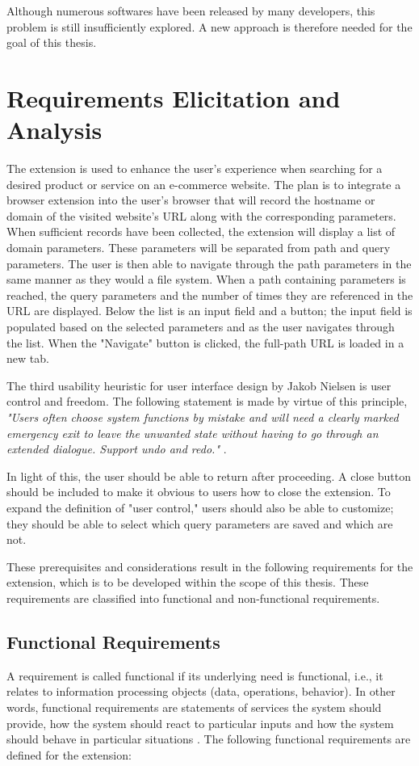 Although numerous softwares have been released by many developers, this problem is still insufficiently explored. A new approach is therefore needed for the goal of this thesis.

\section{Requirements Elicitation and Analysis}
\label{requirements_analysis}
The extension is used to enhance the user's experience when searching for a desired product or service on an e-commerce website. The plan is to integrate a browser extension into the user's browser that will record the hostname or domain of the visited website's URL along with the corresponding parameters. When sufficient records have been collected, the extension will display a list of domain parameters. These parameters will be separated from path and query parameters. The user is then able to navigate through the path parameters in the same manner as they would a file system. When a path containing parameters is reached, the query parameters and the number of times they are referenced in the URL are displayed. Below the list is an input field and a button; the input field is populated based on the selected parameters and as the user navigates through the list. When the "Navigate" button is clicked, the full-path URL is loaded in a new tab.

The third usability heuristic for user interface design by Jakob Nielsen is user control and freedom. The following statement is made by virtue of this principle, \emph{"Users often choose system functions by mistake and will need a clearly marked emergency exit to leave the unwanted state without having to go through an extended dialogue. Support undo and redo."} \autocite{nielsen1994usability}.

In light of this, the user should be able to return after proceeding. A close button should be included to make it obvious to users how to close the extension. To expand the definition of "user control," users should also be able to customize; they should be able to select which query parameters are saved and which are not.

These prerequisites and considerations result in the following requirements for the extension, which is to be developed within the scope of this thesis. These requirements are classified into functional and non-functional requirements.

\subsection{Functional Requirements}
\label{functional_requirements}
A requirement is called functional if its underlying need is functional, i.e., it relates to information processing objects (data, operations, behavior). In other words, functional requirements are statements of services the system should provide, how the system should react to particular inputs and how the system should behave in particular situations \autocite{sommerville2011software}. The following functional requirements are defined for the extension:

